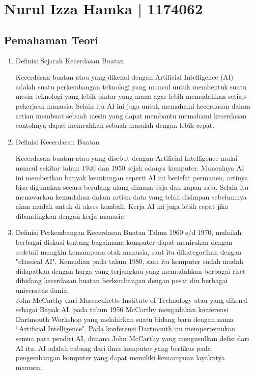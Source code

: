\section{Nurul Izza Hamka | 1174062}
\subsection{Pemahaman Teori}
\begin{enumerate}
\item Definisi Sejarah Kecerdasan Buatan

Kecerdasan buatan atau yang dikenal dengan Artificial Intelligence (AI) adalah suatu perkembangan teknologi yang muncul untuk membentuk suatu mesin teknologi yang lebih pintar yang mana agar lebih memudahkan setiap pekerjaan manusia. Selain itu AI ini juga untuk memahami kecerdasan dalam artian membuat sebuah mesin yang dapat membantu memahami kecerdasan contohnya dapat memcahkan sebuah masalah dengan lebih cepat.

\item Definisi Kecerdasan Buatan

Kecerdasan buatan atau yang disebut dengan Artificial Intelligence mulai muncul sekitar tahun 1940 dan 1950 sejak adanya komputer. Munculnya AI ini memberikan banyak keuntungan seperti AI ini berisfat permanen, artinya bisa digunakan secara berulang-ulang dimana saja dan kapan saja. Selain itu menawarkan kemudahan dalam artian data yang telah disimpan sebelumnya akan mudah untuk di akses kembali. Kerja AI ini juga lebih cepat jika dibandingkan dengan kerja manusia


\item Definisi Perkembangan Kecerdasan Buatan
Tahun 1960 s/d 1970, mulailah berbagai diskusi tentang bagaimana komputer dapat menirukan dengan sedetail mungkin kemampuan otak manusia, saat itu dikategorikan dengan "classical AI". Kemudian pada tahun 1980, saat itu komputer sudah mudah didapatkan dengan harga yang terjangkau yang memudahkan berbagai riset dibidang kecerdasan buatan berkembangan dengan pesat diu berbagai universitas dunia.\\

John McCarthy dari Massacuhetts Institute of Technology atau yang dikenal sebagai Bapak AI, pada tahun 1956 McCarthy mengadakan konferensi Dartmouth Workshop yang melahirkan suatu bidang baru dengan nama “Artificial Intelligence". Pada konferensi Dartmouth itu mempertemukan semua para pendiri AI, dimana John McCarthy yang mengusulkan defisi dari AI itu. AI adalah cabang dari ilmu komputer yang berfikus pada pengembangan komputer yang dapat memiliki kemampuan layakntya manusia.


\end{enumerate}
